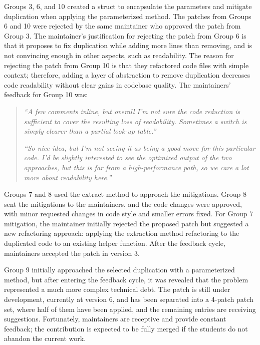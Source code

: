 Groups 3, 6, and 10 created a struct to encapsulate the parameters and mitigate duplication when applying the parameterized method. The patches from Groups 6 and 10 were rejected by the same maintainer who approved the patch from Group 3. The maintainer's justification for rejecting the patch from Group 6 is that it proposes to fix duplication while adding more lines than removing, and is not convincing enough in other aspects, such as readability. The reason for rejecting the patch from Group 10 is that they refactored code files with simple context; therefore, adding a layer of abstraction to remove duplication decreases code readability without clear gains in codebase quality. The maintainers' feedback for Group 10 was:
\begin{quote}

\textit{``A few comments inline, but overall I'm not sure the code reduction is sufficient to cover the resulting loss of readability. Sometimes a switch is simply clearer than a partial look-up table.''}

\textit{``So nice idea, but I'm not seeing it as being a good move for this particular code. I'd be slightly interested to see the optimized output of the two approaches, but this is far from a high-performance path, so we care a lot more about readability here.''}
\end{quote}

Groups 7 and 8 used the extract method to approach the mitigations. Group 8 sent the mitigations to the maintainers, and the code changes were approved, with minor requested changes in code style and smaller errors fixed. For Group 7 mitigation, the maintainer initially rejected the proposed patch but suggested a new refactoring approach: applying the extraction method refactoring to the duplicated code to an existing helper function. After the feedback cycle, maintainers accepted the patch in version 3.

Group 9 initially approached the selected duplication with a parameterized method, but after entering the feedback cycle, it was revealed that the problem represented a much more complex technical debt. The patch is still under development, currently at version 6, and has been separated into a 4-patch patch set, where half of them have been applied, and the remaining entries are receiving suggestions. Fortunately, maintainers are receptive and provide constant feedback; the contribution is expected to be fully merged if the students do not abandon the current work.

